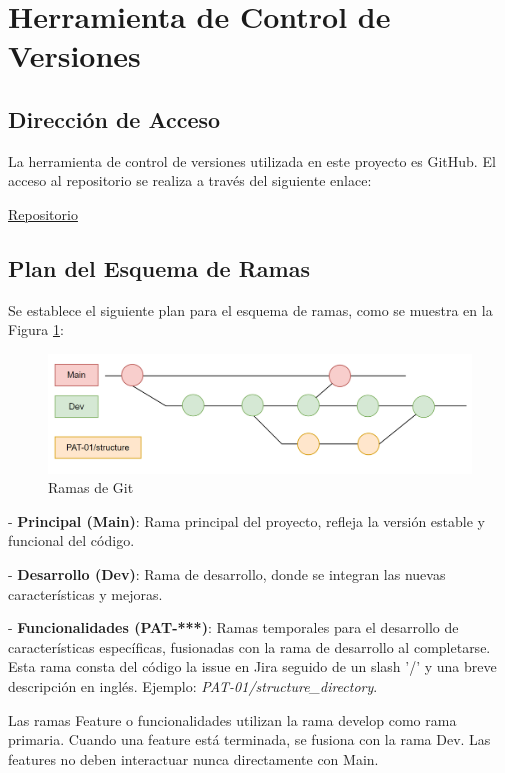 \section{Herramienta de Control de Versiones}

\subsection{Dirección de Acceso}\label{sec:repo-git}
La herramienta de control de versiones utilizada en este proyecto es GitHub. El acceso al repositorio se realiza a través del siguiente enlace:

\href{https://github.com/orgs/proyecto-patrocinio/repositories}{Repositorio}

\subsection{Plan del Esquema de Ramas}
Se establece el siguiente plan para el esquema de ramas, como se muestra en la Figura \ref{fig:branch-plan}:


\begin{figure}[h]
    \centering
    \includegraphics[width=1\linewidth]{fig/branches.png}
    \caption{Ramas de Git}
    \label{fig:branch-plan}
\end{figure}


- \textbf{Principal (Main)}: Rama principal del proyecto, refleja la versión estable y funcional del código.
  
- \textbf{Desarrollo (Dev)}: Rama de desarrollo, donde se integran las nuevas características y mejoras.

- \textbf{Funcionalidades (PAT-***)}: Ramas temporales para el desarrollo de características específicas, fusionadas con la rama de desarrollo al completarse.
Esta rama consta del código la issue en Jira seguido de un slash '/' y una breve descripción en inglés. Ejemplo: \textit{PAT-01/structure\_directory}.

Las ramas Feature o funcionalidades utilizan la rama develop como rama primaria. Cuando una feature está terminada, se fusiona con la rama Dev. Las features no deben interactuar nunca directamente con Main.

